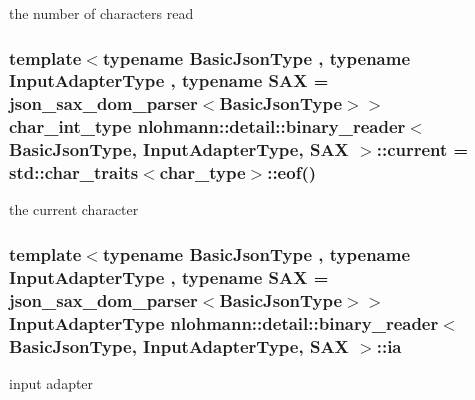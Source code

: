 the number of characters read 

\subsubsection[{\texorpdfstring{current}{current}}]{\setlength{\rightskip}{0pt plus 5cm}template$<$typename Basic\+Json\+Type , typename Input\+Adapter\+Type , typename S\+AX  = json\+\_\+sax\+\_\+dom\+\_\+parser$<$\+Basic\+Json\+Type$>$$>$ {\bf char\+\_\+int\+\_\+type} {\bf nlohmann\+::detail\+::binary\+\_\+reader}$<$ Basic\+Json\+Type, Input\+Adapter\+Type, S\+AX $>$\+::current = std\+::char\+\_\+traits$<${\bf char\+\_\+type}$>$\+::eof()\hspace{0.3cm}{\ttfamily [private]}}\hypertarget{classnlohmann_1_1detail_1_1binary__reader_ab47df98119524e9c7d9ff0b820913883}{}\label{classnlohmann_1_1detail_1_1binary__reader_ab47df98119524e9c7d9ff0b820913883}


the current character 

\subsubsection[{\texorpdfstring{ia}{ia}}]{\setlength{\rightskip}{0pt plus 5cm}template$<$typename Basic\+Json\+Type , typename Input\+Adapter\+Type , typename S\+AX  = json\+\_\+sax\+\_\+dom\+\_\+parser$<$\+Basic\+Json\+Type$>$$>$ Input\+Adapter\+Type {\bf nlohmann\+::detail\+::binary\+\_\+reader}$<$ Basic\+Json\+Type, Input\+Adapter\+Type, S\+AX $>$\+::ia\hspace{0.3cm}{\ttfamily [private]}}\hypertarget{classnlohmann_1_1detail_1_1binary__reader_a548c770e60f2285a931de4b7333c1ab0}{}\label{classnlohmann_1_1detail_1_1binary__reader_a548c770e60f2285a931de4b7333c1ab0}


input adapter 

